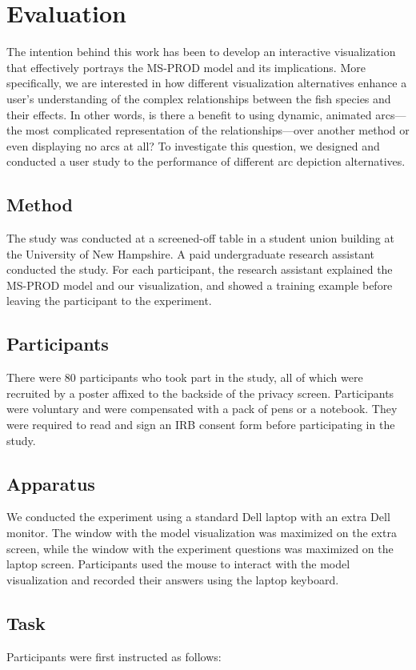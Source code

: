 \chapter{Evaluation}

The intention behind this work has been to develop an interactive visualization that effectively portrays the MS-PROD model and its implications.  More specifically, we are interested in how different visualization alternatives enhance a user's understanding of the complex relationships between the fish species and their effects.  In other words, is there a benefit to using dynamic, animated arcs---the most complicated representation of the relationships---over another method or even displaying no arcs at all?  To investigate this question, we designed and conducted a user study to the performance of different arc depiction alternatives.

\section{Method}

The study was conducted at a screened-off table in a student union building at the University of New Hampshire.  A paid undergraduate research assistant conducted the study.  For each participant, the research assistant explained the MS-PROD model and our visualization, and showed a training example before leaving the participant to the experiment.

\section{Participants}

There were 80 participants who took part in the study, all of which were recruited by a poster affixed to the backside of the privacy screen.  Participants were voluntary and were compensated with a pack of pens or a notebook.  They were required to read and sign an IRB consent form before participating in the study.

\section{Apparatus}

We conducted the experiment using a standard Dell laptop with an extra Dell monitor.  The window with the model visualization was maximized on the extra screen, while the window with the experiment questions was maximized on the laptop screen.  Participants used the mouse to interact with the model visualization and recorded their answers using the laptop keyboard.

\section{Task}

Participants were first instructed as follows:


